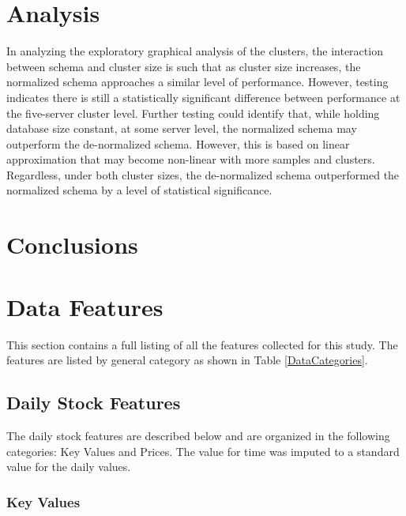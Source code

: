 \documentclass[journal]{IEEEtran}
\begin{document}
\section{Analysis}

In analyzing the exploratory graphical analysis of the clusters, 
 the interaction between schema and cluster size is such that as cluster size increases,
 the normalized schema approaches a similar level of performance. 
However, testing indicates there is still a statistically significant difference between 
 performance at the five-server cluster level. 
Further testing could identify that, while holding database size constant, at some server level, 
 the normalized schema may outperform the de-normalized schema. 
However, this is based on linear approximation that may become non-linear with more samples and clusters. 
Regardless, under both cluster sizes,
 the de-normalized schema outperformed the normalized schema by a level of statistical significance.

\section{Conclusions}



\ifCLASSOPTIONcaptionsoff
  \newpage
\fi

\appendices

\section{Data Features}
\label{DataFeatures}

This section contains a full listing of all the features collected for this
 study. The features are listed by general category as shown in 
 Table \ref{DataCategories}.

\subsection{Daily Stock Features}

The daily stock features are described below and are organized in the
 following categories: Key Values and Prices.
The value for time was imputed to a standard value for the daily values.

\subsubsection{Key Values}
\end{document}
